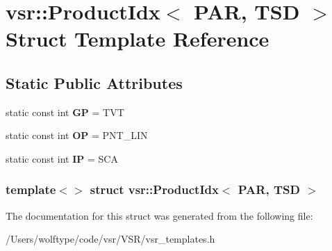 \hypertarget{structvsr_1_1_product_idx_3_01_p_a_r_00_01_t_s_d_01_4}{\section{vsr\-:\-:Product\-Idx$<$ P\-A\-R, T\-S\-D $>$ Struct Template Reference}
\label{structvsr_1_1_product_idx_3_01_p_a_r_00_01_t_s_d_01_4}
}
\subsection*{Static Public Attributes}
\begin{DoxyCompactItemize}
\item 
\hypertarget{structvsr_1_1_product_idx_3_01_p_a_r_00_01_t_s_d_01_4_a064b769b378fa290d69b1ae48bc3a8fa}{static const int {\bfseries G\-P} = T\-V\-T}\label{structvsr_1_1_product_idx_3_01_p_a_r_00_01_t_s_d_01_4_a064b769b378fa290d69b1ae48bc3a8fa}

\item 
\hypertarget{structvsr_1_1_product_idx_3_01_p_a_r_00_01_t_s_d_01_4_a50c63d51dc724e55048e540619a24667}{static const int {\bfseries O\-P} = P\-N\-T\-\_\-\-L\-I\-N}\label{structvsr_1_1_product_idx_3_01_p_a_r_00_01_t_s_d_01_4_a50c63d51dc724e55048e540619a24667}

\item 
\hypertarget{structvsr_1_1_product_idx_3_01_p_a_r_00_01_t_s_d_01_4_a3f369fbeef0cc1a9c3e4b73c63c33cc6}{static const int {\bfseries I\-P} = S\-C\-A}\label{structvsr_1_1_product_idx_3_01_p_a_r_00_01_t_s_d_01_4_a3f369fbeef0cc1a9c3e4b73c63c33cc6}

\end{DoxyCompactItemize}
\subsubsection*{template$<$$>$ struct vsr\-::\-Product\-Idx$<$ P\-A\-R, T\-S\-D $>$}



The documentation for this struct was generated from the following file\-:\begin{DoxyCompactItemize}
\item 
/\-Users/wolftype/code/vsr/\-V\-S\-R/vsr\-\_\-templates.\-h\end{DoxyCompactItemize}
